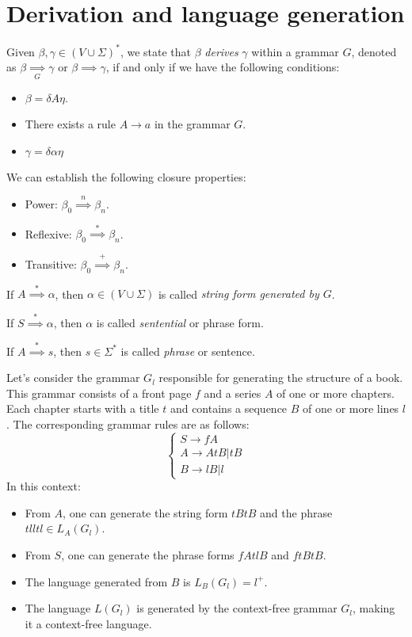 \section{Derivation and language generation}

\begin{definition}
    Given $\beta, \gamma \in (V \cup \Sigma)^{*}$, we state that $\beta$ \emph{derives} $\gamma$ within a grammar $G$, denoted as $\beta\underset{G}{\implies}\gamma$ or $\beta\implies\gamma$, if and only if we have the following conditions:
    \begin{itemize}
        \item $\beta=\delta A \eta$. 
        \item There exists a rule $A\rightarrow a$ in the grammar $G$. 
        \item $\gamma=\delta\alpha\eta$
    \end{itemize}
\end{definition}
We can establish the following closure properties:
\begin{itemize}
    \item Power: $\beta_0 \overset{n}{\implies} \beta_n$. 
    \item Reflexive: $\beta_0 \overset{*}{\implies} \beta_n$. 
    \item Transitive: $\beta_0 \overset{+}{\implies} \beta_n$. 
\end{itemize}
\begin{definition}
    If $A \overset{*}{\implies} \alpha$, then $\alpha \in (V \cup \Sigma)$ is called \emph{string form generated by $G$}. 

    If $S \overset{*}{\implies} \alpha$, then $\alpha$ is called \emph{sentential} or phrase form.

    If $A \overset{*}{\implies} s$, then $s \in \Sigma^{*}$ is called \emph{phrase} or sentence. 
\end{definition}
\begin{example}
    Let's consider the grammar $G_l$ responsible for generating the structure of a book. 
    This grammar consists of a front page $f$ and a series $A$ of one or more chapters. 
    Each chapter starts with a title $t$ and contains a sequence $B$ of one or more lines $l$. 
    The corresponding grammar rules are as follows:
    \[
    \begin{cases}
        S \rightarrow fA \\
        A \rightarrow AtB | tB \\
        B \rightarrow lB | l
    \end{cases}
    \]
    In this context:
    \begin{itemize}
        \item From $A$, one can generate the string form $tBtB$ and the phrase $tlltl \in L_A(G_l)$. 
        \item From $S$, one can generate the phrase forms $fAtlB$ and $ftBtB$. 
        \item The language generated from $B$ is $L_B(G_l)=l^{+}$.
        \item The language $L(G_l)$ is generated by the context-free grammar $G_l$, making it a context-free language.
    \end{itemize}
\end{example}
